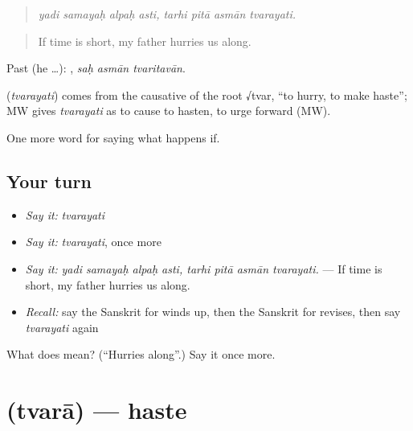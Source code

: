\begin{quote}
\emph{yadi samayaḥ alpaḥ asti, tarhi pitā asmān tvarayati.}
\end{quote}

\begin{quote}
If time is short, my father hurries us along.
\end{quote}

Past (he …):   , \emph{saḥ asmān tvaritavān}.

\begin{cousinweb}
\textbf{} (\emph{tvarayati}) comes from the causative of the root √tvar, \textquotedblleft{}to hurry, to make haste\textquotedblright{}; MW gives \emph{tvarayati} as to cause to hasten, to urge forward (MW).
\end{cousinweb}

\begin{grammarlens}[title={What you've built}]
One more word for saying what happens if.
\end{grammarlens}

\subsection*{Your turn}
\begin{itemize}
\raggedright
  \item \emph{Say it:} \emph{tvarayati}
  \item \emph{Say it:} \emph{tvarayati}, once more
  \item \emph{Say it:} \emph{yadi samayaḥ alpaḥ asti, tarhi pitā asmān tvarayati.} — If time is short, my father hurries us along.
  \item \emph{Recall:} say the Sanskrit for winds up, then the Sanskrit for revises, then say \emph{tvarayati} again
\end{itemize}

\begin{tcolorbox}[breakable,colback=teal!4,colframe=teal!35!black,title={Before you move on}]
What does  mean? (\textquotedblleft{}Hurries along\textquotedblright{}.) Say it once more.
\end{tcolorbox}
\section[\texorpdfstring{\sk{त्वरा} (tvarā)}{त्वरा (tvarā)}]{ (tvarā) — haste}

\label{lesson:SA-C529-tvara}



